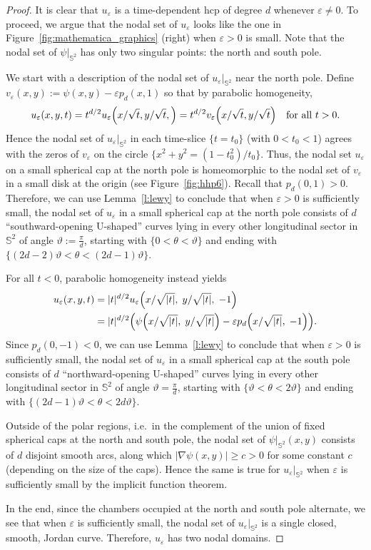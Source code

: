 \documentclass[AHL,Unicode,longabstracts,published]{cedram}
\newcommand{\sphere}{\mathbb{S}}
\renewcommand{\epsilon}{\varepsilon}
\let\originalleft\left
\let\originalright\right
\renewcommand{\left}{\mathopen{}\mathclose\bgroup\originalleft}
\renewcommand{\right}{\aftergroup\egroup\originalright}
\begin{document}
\begin{proof}
It is clear that $u_\epsilon$ is a time-dependent hcp of degree $d$ whenever $\epsilon\neq 0$. To proceed, we argue that the nodal set of $u_\epsilon$ looks like the one in Figure~\ref{fig:mathematica_graphics} (right) when $\epsilon>0$ is small. Note that the nodal set of $\psi|_{\sphere^2}$ has only two singular points: the north and south pole.

We start with a description of the nodal set of $u_\epsilon|_{\sphere^2}$ near the north pole. Define $v_\epsilon (x,y):=\psi(x,y)-\epsilon p_d(x,1)$ so that by parabolic homogeneity,
\[
u_\epsilon(x,y,t)= t^{d/2} u_\epsilon\left(x/\sqrt{t},y/\sqrt{t},\right)=t^{d/2}v_\epsilon\left(x/\sqrt{t},y/\sqrt{t}\right)\quad\text{for all $t>0$}.
\]
Hence the nodal set of $u_{\epsilon}|_{\sphere^2}$ in each time-slice $\{t=t_0\}$ (with $0<t_0<1$) agrees with the zeros of $v_{\epsilon}$ on the circle $\{x^2 + y^2 = (1-t_0^2)/t_0 \}$. Thus, the nodal set $u_\epsilon$ on a small spherical cap at the north pole is homeomorphic to the nodal set of $v_\epsilon$ in a small disk at the origin (see Figure~\ref{fig:hhp6}). Recall that $p_d(0,1)>0$. Therefore, we can use Lemma~\ref{l:lewy} to conclude that when $\epsilon>0$ is sufficiently small, the nodal set of $u_\epsilon$ in a small spherical cap at the north pole consists of $d$ ``southward-opening U-shaped'' curves lying in every other longitudinal sector in $\sphere^2$ of angle $\vartheta:=\frac{\pi}{d}$, starting with $\{0 < \theta < \vartheta\}$ and ending with $\{(2d-2)\vartheta<\theta<(2d-1)\vartheta\}$.

For all $t<0$, parabolic homogeneity instead yields
\begin{align*}
u_\epsilon(x,y,t) &=|t|^{d/2}u_\epsilon\left(x/\sqrt{|t|},\;y/\sqrt{|t|},\;-1\right)\\
&=|t|^{d/2}\left(\psi\left(x/\sqrt{|t|},\;y/\sqrt{|t|}\right)-\epsilon p_d\left(x/\sqrt{|t|},\;-1\right)\right).
\end{align*}
Since $p_d(0,-1)<0$, we can use Lemma~\ref{l:lewy} to conclude that when $\epsilon>0$ is sufficiently small, the nodal set of $u_\epsilon$ in a small spherical cap at the south pole consists of $d$ ``northward-opening U-shaped'' curves lying in every other longitudinal sector in $\sphere^2$ of angle $\vartheta=\frac{\pi}{d}$, starting with $\{\vartheta < \theta < 2\vartheta\}$ and ending with $\{(2d-1)\vartheta<\theta<2d\vartheta\}$.

Outside of the polar regions, i.e.~in the complement of the union of fixed spherical caps at the north and south pole, the nodal set of $\psi|_{\sphere^2}(x,y)$ consists of $d$ disjoint smooth arcs, along which $|\nabla \psi(x,y)|\geq c>0$ for some constant $c$ (depending on the size of the caps). Hence the same is true for $u_\epsilon|_{\sphere^2}$ when $\epsilon$ is sufficiently small by the implicit function theorem.

In the end, since the chambers occupied at the north and south pole alternate, we see that when $\epsilon$ is sufficiently small, the nodal set of $u_\epsilon|_{\sphere^2}$ is a single closed, smooth, Jordan curve. Therefore, $u_\epsilon$ has two nodal domains.
\end{proof}
\end{document}
